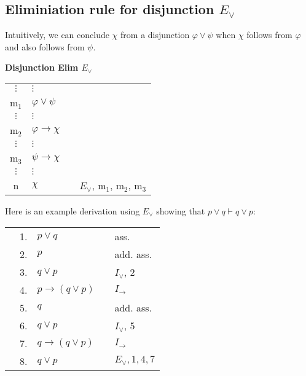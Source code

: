 \documentclass[nobib,nofonts]{tufte-handout}
\begin{document}
\subsection{Eliminiation rule for disjunction $E_{\vee}$}

Intuitively, we can conclude $\chi$ from a disjunction $\varphi \vee \psi$ when $\chi$ follows from $\varphi$ and also follows from $\psi$.

\bigskip
\noindent \colorbox{mygray!60}{\centering
  \begin{minipage}[t]{0.35\linewidth}
    \textbf{Disjunction Elim $E_{\vee}$}
  \end{minipage}
  \begin{minipage}[t]{0.55\linewidth}
    \begin{tabular}{clcl}
            $\vdots$ & $\vdots$                   & \\
      m$_{1}$        & $\varphi \vee \psi$        &  \\
            $\vdots$ & $\vdots$                   & \\
      m$_{2}$        & $\varphi \rightarrow \chi$ &  \\
            $\vdots$ & $\vdots$                   & \\
      m$_{3}$        & $\psi  \rightarrow \chi$   &  \\
            $\vdots$ & $\vdots$                   & \\
      n             & $\chi$                     & & $E_{\vee}$, m$_{1}$, m$_{2}$, m$_{3}$
    \end{tabular}
  \end{minipage}
}
\bigskip

Here is an example derivation using $E_{\vee}$ showing that $p \vee q \vdash q \vee p$:

\begin{tabular}{cclcl}
                     & 1. & $p \vee q$                  & & ass. \\
  \cline{1-2} \vline & 2. & $p$                         & & add. ass. \\
  \vline             & 3. & $q \vee p$                  & & $I_{\vee}$, 2  \\ \hline
                     & 4. & $p \rightarrow (q \vee p)$  & & $I_{\rightarrow}$  \\
  \cline{1-2} \vline & 5. & $q$                         & & add. ass. \\
  \vline             & 6. & $q \vee p$                  & & $I_{\vee}$, 5  \\ \hline
                     & 7. & $q \rightarrow (q \vee p) $ & & $I_{\rightarrow}$  \\
  & 8. & $q \vee p $ & & $E_{\vee}, 1, 4, 7$  \\
\end{tabular}
\end{document}
